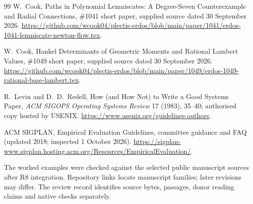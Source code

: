 \begin{thebibliography}{99}
W.~Cook, Paths in Polynomial Lemniscates: A Degree-Seven Counterexample and Radial Connections,
\#1041 short paper, supplied source dated 30 September 2026.
\url{https://github.com/wcook04/plectis-erdos/blob/main/paper/1041/erdos-1041-lemniscate-newton-flow.tex}.

W.~Cook, Hankel Determinants of Geometric Moments and Rational Lambert Values,
\#1049 short paper, supplied source dated 30 September 2026.
\url{https://github.com/wcook04/plectis-erdos/blob/main/paper/1049/erdos-1049-rational-base-lambert.tex}.

R.~Levin and D.~D.~Redell, How (and How Not) to Write a Good Systems Paper,
\emph{ACM SIGOPS Operating Systems Review} 17 (1983), 35--40;
authorised copy hosted by USENIX.
\url{https://www.usenix.org/guidelines-authors}.

ACM SIGPLAN, Empirical Evaluation Guidelines, committee guidance and FAQ
(updated 2018; inspected 1 October 2026).
\url{https://sigplan-www.sigplan.hosting.acm.org/Resources/EmpiricalEvaluation/}.

\end{thebibliography}

\noindent\small The worked examples were checked against the selected public manuscript
sources after R8 integration. Repository links locate manuscript families;
later revisions may differ. The review record identifies source bytes,
passages, donor reading claims and native checks separately.
